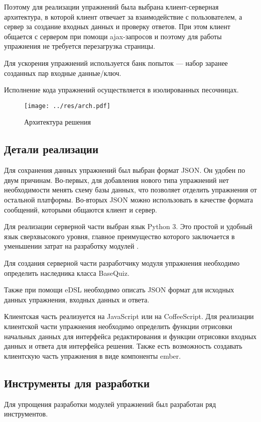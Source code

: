 \documentclass{matmex-diploma-custom}
\begin{document}
Поэтому для реализации упражнений была выбрана клиент-серверная
архитектура, в которой клиент отвечает за взаимодействие с
пользователем, а сервер за создание входных данных и проверку
ответов. При этом клиент общается с сервером при помощи ajax-запросов
и поэтому для работы упражнения не требуется перезагрузка страницы.

Для ускорения упражнений используется банк попыток --- набор
заранее созданных пар входные данные/ключ.

Исполнение кода упражнений осуществляется в изолированных песочницах.

\begin{figure}
  \texttt{[image: ../res/arch.pdf]}
  \caption{Архитектура решения}
\end{figure}

\subsection{Детали реализации}
Для сохранения данных упражнений был выбран формат JSON. Он удобен по
двум причинам. Во-первых, для добавления нового типа упражнений нет
необходимости менять схему базы данных, что позволяет отделить
упражнения от остальной платформы. Во-вторых JSON можно использовать в
качестве формата сообщений, которыми общаются клиент и сервер.

Для реализации серверной части выбран язык Python 3. Это простой и
удобный язык сверхвысокого уровня, главное преимущество которого
заключается в уменьшении затрат на разработку модулей \cite{pyprod}.

Для создания серверной части разработчику модуля упражнения необходимо
определить наследника класса BaseQuiz.

Также при помощи eDSL необходимо описать JSON формат для исходных
данных упражнения, входных данных и ответа.

Клиентская часть реализуется на JavaScript или на CoffeeScript. Для
реализации клиентской части упражнения необходимо определить функции
отрисовки начальных данных для интерфейса редактирования и функции
отрисовки входных данных и ответа для интерфейса решения. Также есть
возможность создавать клиентскую часть упражнения в виде компоненты ember.

\subsection{Инструменты для разработки}
Для упрощения разработки модулей упражнений был разработан ряд
инструментов.
\end{document}
